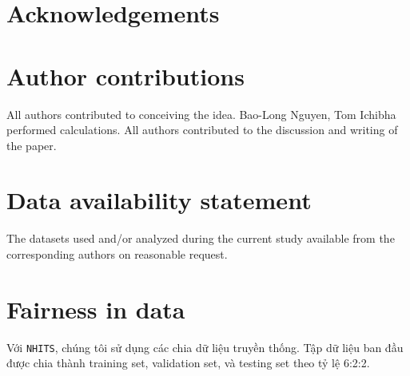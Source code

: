 \documentclass[aps,prb,groupedaddress,twocolumn,showpacs,dvipdfmx,superscriptaddress,pdftex]{revtex4-2}
\begin{document}

\section{Acknowledgements}

\section{Author contributions}
All authors contributed to conceiving the idea. Bao-Long Nguyen, Tom Ichibha performed calculations. All authors contributed to the discussion and writing of the paper.

\section{Data availability statement}
The datasets used and/or analyzed during the current study available from the corresponding authors on reasonable request.

% 


\clearpage

\appendix
\section{Fairness in data}
\label{app:data}

Với \verb|NHITS|, chúng tôi sử dụng các chia dữ liệu truyền thống. Tập dữ liệu ban đầu được chia thành training set, validation set, và testing set theo tỷ lệ 6:2:2.
\end{document}
